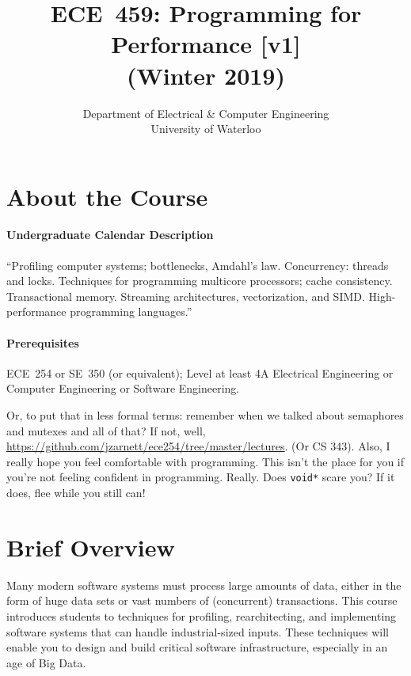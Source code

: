 \documentclass[letterpaper,10pt]{article}
\date{}
\let\LaTeXtitle\title
\renewcommand{\title}[1]{\LaTeXtitle{\textsf{#1}}}
\begin{document}
\title{\bf\LARGE ECE~459: Programming for Performance [v1]\\ (Winter 2019)}
\author{Department of Electrical \& Computer Engineering \\
                University of Waterloo}
\renewcommand{\today}{}
\maketitle
\vspace*{-2em}

\section*{About the Course}

\paragraph{Undergraduate Calendar Description} ``Profiling computer systems; bottlenecks, Amdahl's law. Concurrency: threads and locks. Techniques for programming multicore processors; cache consistency. Transactional memory. Streaming architectures, vectorization, and SIMD. High-performance programming languages.''

\paragraph{Prerequisites} ECE~254 or SE~350 (or equivalent); Level at least 4A Electrical Engineering or Computer Engineering or Software Engineering.

Or, to put that in less formal terms: remember when we talked about semaphores and mutexes and all of that? If not, well, \url{https://github.com/jzarnett/ece254/tree/master/lectures}. (Or CS 343). Also, I really hope you feel comfortable with programming. This isn't the place for you if you're not feeling confident in programming. Really. Does \texttt{void*} scare you? If it does, flee while you still can!

\section*{Brief Overview}

Many modern software systems must process large amounts of data, either in the
form of huge data sets or vast numbers of (concurrent) transactions.  This
course introduces students to techniques for profiling, rearchitecting, and
implementing software systems that can handle industrial-sized
inputs. These techniques will enable you to design and build
critical software infrastructure, especially in an age of Big Data.
\end{document}

